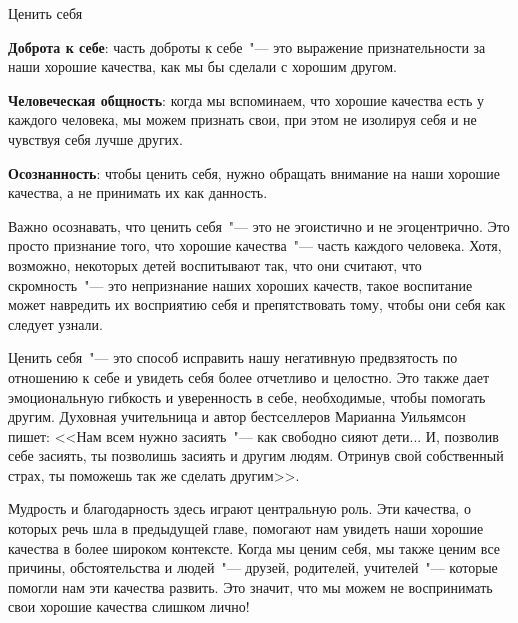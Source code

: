 \vspace{5ex}

\begin{center}
	{\Large Ценить себя}
\end{center}

\textbf{Доброта к себе}: часть доброты к себе~"--- это выражение признательности за наши хорошие качества, как мы бы сделали с хорошим другом. 

\vspace{2ex}

\textbf{Человеческая общность}: когда мы вспоминаем, что хорошие качества есть у каждого человека, мы можем признать свои, при этом не изолируя себя и не чувствуя себя лучше других. 

\vspace{2ex}

\textbf{Осознанность}: чтобы ценить себя, нужно обращать внимание на наши хорошие качества, а не принимать их как данность. 

\vspace{5ex}

Важно осознавать, что ценить себя~"--- это не эгоистично и не эгоцентрично. Это просто признание того, что хорошие качества~"--- часть каждого человека. Хотя, возможно, некоторых детей воспитывают так, что они считают, что скромность~"--- это непризнание наших хороших качеств, такое воспитание может навредить их восприятию себя и препятствовать тому, чтобы они себя как следует узнали.

Ценить себя~"--- это способ исправить нашу негативную предвзятость по отношению к себе и увидеть себя более отчетливо и целостно\cite{131}. Это также дает эмоциональную гибкость и уверенность в себе, необходимые, чтобы помогать другим. Духовная учительница и автор бестселлеров Марианна Уильямсон пишет: <<Нам всем нужно засиять~"--- как свободно сияют дети... И, позволив себе засиять, ты позволишь засиять и другим людям. Отринув свой собственный страх, ты поможешь так же сделать другим>>.

Мудрость и благодарность здесь играют центральную роль. Эти качества, о которых речь шла в предыдущей главе, помогают нам увидеть наши хорошие качества в более широком контексте. Когда мы ценим себя, мы также ценим все причины, обстоятельства и людей~"--- друзей, родителей, учителей~"--- которые помогли нам эти качества развить. Это значит, что мы можем не воспринимать свои хорошие качества слишком лично! 

